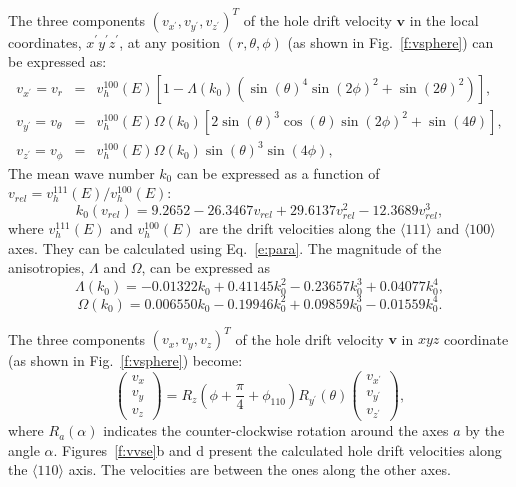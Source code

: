 \documentclass[epj]{svjour}
\begin{document}
The three components $(v_{x^{\prime}}, v_{y^{\prime}},
v_{z^{\prime}})^{T}$ of the hole drift velocity $\mathbf{v}$ in the
local coordinates, $x^{\prime}y^{\prime}z^{\prime}$, at any position
$(r, \theta, \phi)$ (as shown in Fig.~\ref{f:vsphere}) can be
expressed as:
\begin{equation} 
\label{e:vsphere} 
\begin{array}{rcl} 
v_{x^{\prime}} = v_{r} &=& v^{100}_{h}(E)
[1-\Lambda(k_{0})(\sin(\theta)^{4}\sin(2\phi)^{2} + \sin(2\theta)^{2})],\\ 
v_{y^{\prime}} = v_{\theta} &=& v^{100}_{h}(E)\Omega(k_{0})
[2\sin(\theta)^{3}\cos(\theta)\sin(2\phi)^{2} + \sin(4\theta)],\\ 
v_{z^{\prime}} = v_{\phi} &=& v^{100}_{h}(E)\Omega(k_{0})\sin(\theta)^{3}\sin(4\phi), 
\end{array} 
\end{equation} 
The mean wave number $k_{0}$ can be expressed as a function of
$v_{rel} = v^{111}_{h}(E)/v^{100}_{h}(E)$:
\begin{equation} 
\label{e:k0} 
k_{0}(v_{rel}) = 9.2652 - 26.3467v_{rel} + 29.6137v_{rel}^{2} - 12.3689v_{rel}^{3}, 
\end{equation} 
where $v^{111}_{h}(E)$ and $v^{100}_{h}(E)$ are the drift velocities
along the $\langle111\rangle$ and $\langle100\rangle$ axes. They can
be calculated using Eq.~\ref{e:para}. The magnitude of the
anisotropies, $\Lambda$ and $\Omega$, can be expressed as
\begin{equation} 
\label{e:lamb} 
\Lambda(k_{0}) = -0.01322k_{0} + 0.41145k_{0}^{2} - 0.23657k_{0}^{3} + 0.04077k_{0}^{4}, 
\end{equation} 
\begin{equation} 
\label{e:ome} 
\Omega(k_{0}) = 0.006550k_{0} - 0.19946k_{0}^{2} + 0.09859k_{0}^{3} - 0.01559k_{0}^{4}. 
\end{equation} 
 
The three components $(v_{x}, v_{y}, v_{z})^{T}$ of the hole drift
velocity $\mathbf{v}$ in $xyz$ coordinate (as shown in
Fig.~\ref{f:vsphere}) become:
\begin{equation} 
\label{e:v2v}   
\left( 
\begin{array}{c} 
v_{x} \\ v_{y} \\ v_{z} 
\end{array} 
\right) = R_{z}(\phi + \frac{\pi}{4} + \phi_{110}) R_{y^{\prime}}(\theta) \left(  
\begin{array}{c} 
v_{x^{\prime}} \\ v_{y^{\prime}} \\ v_{z^{\prime}} 
\end{array} \right), 
\end{equation} 
where $R_a(\alpha)$ indicates the counter-clockwise rotation around
the axes $a$ by the angle $\alpha$.  Figures~\ref{f:vvse}b and d
present the calculated hole drift velocities along the $\langle 110
\rangle$ axis. The velocities are between the ones along the other
axes.
\end{document}
